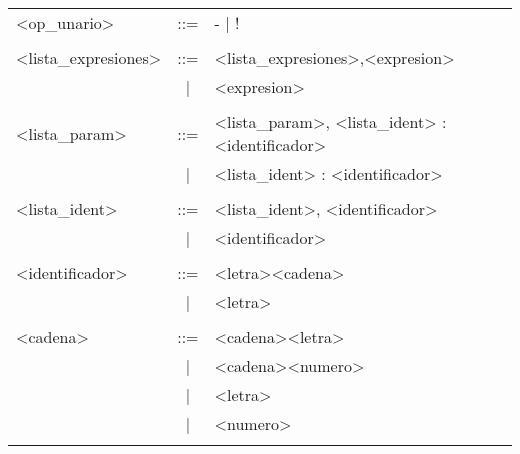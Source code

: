 \begin{tabular}{| p{3.5cm} c p{10cm} |}
<op\_unario>               &::=&  - |  ! \\
&&\\

<lista\_expresiones>       &::=&  <lista\_expresiones>,<expresion> \\
                           &|&  <expresion> \\
&&\\

<lista\_param>             &::=&  <lista\_param>, <lista\_ident> : <identificador>  \\
                           &|&  <lista\_ident> : <identificador> \\
&&\\

<lista\_ident>             &::=&  <lista\_ident>, <identificador> \\
                           &|&  <identificador> \\
&&\\

<identificador>           &::=&  <letra><cadena> \\
                           &|&  <letra> \\
&&\\
                         
<cadena>                  &::=&  <cadena><letra> \\
                           &|&  <cadena><numero> \\
                           &|&  <letra> \\
                           &|&  <numero> \\
&&\\
\hline
\end{tabular}
\newpage
